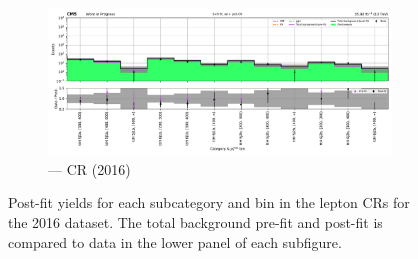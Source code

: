 \begin{figure}[htbp]
    \begin{subfigure}[b]{0.65\textwidth}
        \includegraphics[width=\textwidth]{chapters/higgstoinv/figures/mountain_ranges/2016/ttH/Zee_tree_fit_s-abs_values_ttH_cats.pdf}
        \caption{\ttH --- \doubleEleCr \gls{CR} (2016)}
    \end{subfigure}
    \caption[Post-fit yields for each \ttH subcategory and \ptmiss bin in the lepton control regions for the 2016 dataset]{Post-fit yields for each \ttH subcategory and \ptmiss bin in the lepton \glspl{CR} for the 2016 dataset. The total background pre-fit and post-fit is compared to data in the lower panel of each subfigure.}
    \label{fig:htoinv_mountain_range_ttH_2016_CRs}
\end{figure}


